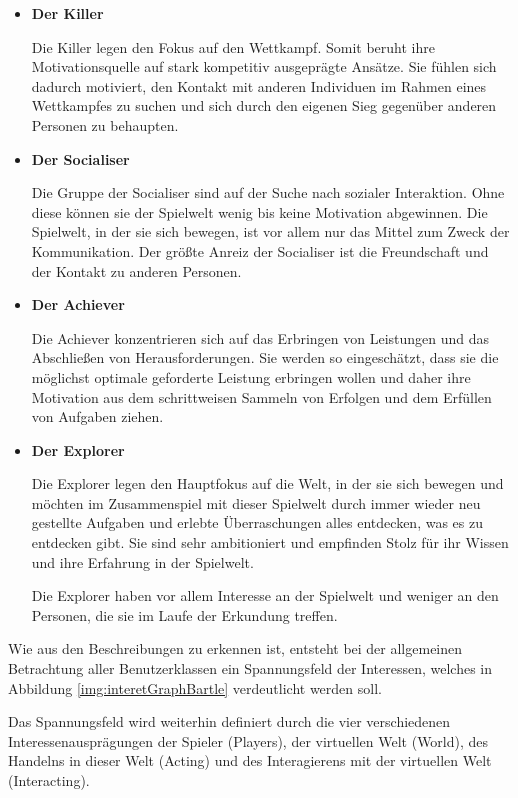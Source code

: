\documentclass[bibliography=totoc,listof=totoc,BCOR=5mm,DIV=12,oneside]{scrbook}
\begin{document}
\begin{itemize}
\item \textbf{Der Killer}
\par Die Killer legen den Fokus auf den Wettkampf. Somit beruht ihre Motivationsquelle auf stark kompetitiv ausgeprägte Ansätze. Sie fühlen sich dadurch motiviert, den Kontakt mit anderen Individuen im Rahmen eines Wettkampfes zu suchen und sich durch den eigenen Sieg gegenüber anderen Personen zu behaupten.

\item \textbf{Der Socialiser}
\par Die Gruppe der Socialiser sind auf der Suche nach sozialer Interaktion. Ohne diese können sie der Spielwelt wenig bis keine Motivation abgewinnen. Die Spielwelt, in der sie sich bewegen, ist vor allem nur das Mittel zum Zweck der Kommunikation. Der größte Anreiz der Socialiser ist die Freundschaft und der Kontakt zu anderen Personen.

\item \textbf{Der Achiever}
\par Die Achiever konzentrieren sich auf das Erbringen von Leistungen und das Abschließen von Herausforderungen. Sie werden so eingeschätzt, dass sie die möglichst optimale geforderte Leistung erbringen wollen und daher ihre Motivation aus dem schrittweisen Sammeln von Erfolgen und dem Erfüllen von Aufgaben ziehen.

\newpage
\item \textbf{Der Explorer}
\par Die Explorer legen den Hauptfokus auf die Welt, in der sie sich bewegen und möchten im Zusammenspiel mit dieser Spielwelt durch immer wieder neu gestellte Aufgaben und erlebte Überraschungen alles entdecken, was es zu entdecken gibt. Sie sind sehr ambitioniert und empfinden Stolz für ihr Wissen und ihre Erfahrung in der Spielwelt. 
\par Die Explorer haben vor allem Interesse an der Spielwelt und weniger an den Personen, die sie im Laufe der Erkundung treffen.
\end{itemize}

\par \bigskip Wie aus den Beschreibungen zu erkennen ist, entsteht bei der allgemeinen Betrachtung aller Benutzerklassen ein Spannungsfeld der Interessen, welches in Abbildung \ref{img:interetGraphBartle} verdeutlicht werden soll.
\par \bigskip Das Spannungsfeld wird weiterhin definiert durch die vier verschiedenen Interessenausprägungen der Spieler (Players), der virtuellen Welt (World), des Handelns in dieser Welt (Acting) und des Interagierens mit der virtuellen Welt (Interacting).
\end{document}

